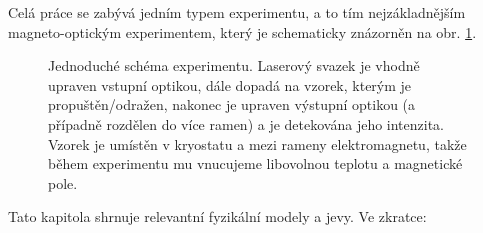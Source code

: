 Celá práce se zabývá jedním typem experimentu, a to tím nejzákladnějším magneto-optickým experimentem, který je schematicky znázorněn na obr. \ref{fig:zakladni-schema}.

\begin{figure}[htbp]
    \centering
    \caption{Jednoduché schéma experimentu. 
    Laserový svazek je vhodně upraven vstupní optikou, dále dopadá na vzorek, kterým je propuštěn/odražen, nakonec je upraven výstupní optikou (a případně rozdělen do více ramen) a je detekována jeho intenzita. 
    Vzorek je umístěn v kryostatu a mezi rameny elektromagnetu, takže během experimentu mu vnucujeme libovolnou teplotu a magnetické pole.}
    \label{fig:zakladni-schema}
\end{figure}

Tato kapitola shrnuje relevantní fyzikální modely a jevy.
Ve zkratce:
